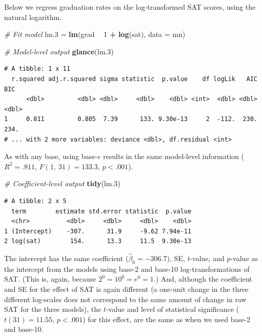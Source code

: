 \documentclass[]{book}
\newenvironment{Shaded}{\begin{snugshade}}{\end{snugshade}}
\newcommand{\CommentTok}[1]{\textcolor[rgb]{0.56,0.35,0.01}{\textit{#1}}}
\newcommand{\DataTypeTok}[1]{\textcolor[rgb]{0.13,0.29,0.53}{#1}}
\newcommand{\DecValTok}[1]{\textcolor[rgb]{0.00,0.00,0.81}{#1}}
\newcommand{\FloatTok}[1]{\textcolor[rgb]{0.00,0.00,0.81}{#1}}
\newcommand{\KeywordTok}[1]{\textcolor[rgb]{0.13,0.29,0.53}{\textbf{#1}}}
\newcommand{\NormalTok}[1]{#1}
\newcommand{\OperatorTok}[1]{\textcolor[rgb]{0.81,0.36,0.00}{\textbf{#1}}}
\newcommand{\StringTok}[1]{\textcolor[rgb]{0.31,0.60,0.02}{#1}}
\begin{document}
Below we regress graduation rates on the log-transformed SAT scores, using the natural logarithm.

\begin{Shaded}
\begin{Highlighting}[]
\CommentTok{# Fit model}
\NormalTok{lm}\FloatTok{.3}\NormalTok{ =}\StringTok{ }\KeywordTok{lm}\NormalTok{(grad }\OperatorTok{~}\StringTok{ }\DecValTok{1} \OperatorTok{+}\StringTok{ }\KeywordTok{log}\NormalTok{(sat), }\DataTypeTok{data =}\NormalTok{ mn)}

\CommentTok{# Model-level output}
\KeywordTok{glance}\NormalTok{(lm}\FloatTok{.3}\NormalTok{)}
\end{Highlighting}
\end{Shaded}

\begin{verbatim}
# A tibble: 1 x 11
  r.squared adj.r.squared sigma statistic  p.value    df logLik   AIC   BIC
      <dbl>         <dbl> <dbl>     <dbl>    <dbl> <int>  <dbl> <dbl> <dbl>
1     0.811         0.805  7.39      133. 9.30e-13     2  -112.  230.  234.
# ... with 2 more variables: deviance <dbl>, df.residual <int>
\end{verbatim}

As with any base, using base-\(e\) results in the same model-level information (\(R^2=.811\), \(F(1,~31)=133.3\), \(p<.001\)).

\begin{Shaded}
\begin{Highlighting}[]
\CommentTok{# Coefficient-level output}
\KeywordTok{tidy}\NormalTok{(lm}\FloatTok{.3}\NormalTok{)}
\end{Highlighting}
\end{Shaded}

\begin{verbatim}
# A tibble: 2 x 5
  term        estimate std.error statistic  p.value
  <chr>          <dbl>     <dbl>     <dbl>    <dbl>
1 (Intercept)    -307.      31.9     -9.62 7.94e-11
2 log(sat)        154.      13.3     11.5  9.30e-13
\end{verbatim}

The intercept has the same coefficient (\(\hat\beta_0=-306.7\)), SE, \(t\)-value, and \(p\)-value as the intercept from the models using base-2 and base-10 log-transformations of SAT. (This is, again, because \(2^0=10^0=e^0=1\).) And, although the coefficient and SE for the effect of SAT is again different (a one-unit change in the three different log-scales does not correspond to the same amount of change in raw SAT for the three models), the \(t\)-value and level of statistical significance (\(t(31)=11.55\), \(p<.001\)) for this effect, are the same as when we used base-2 and base-10.
\end{document}
